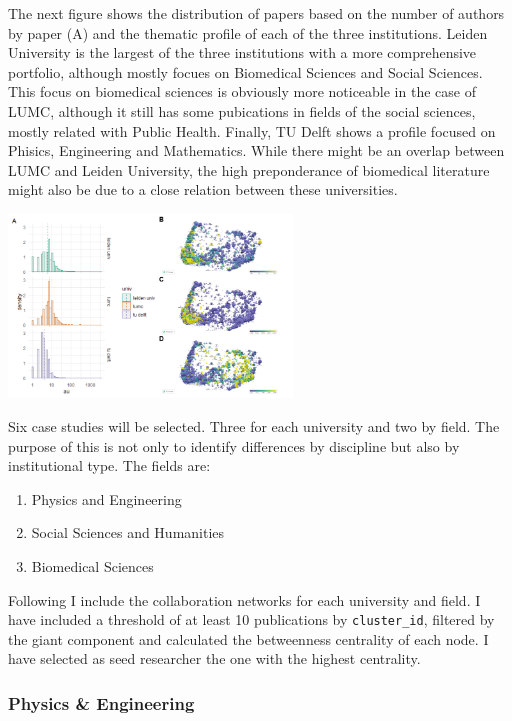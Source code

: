 \documentclass[]{elsarticle} %
\providecommand{\tightlist}{%
  \setlength{\itemsep}{0pt}\setlength{\parskip}{0pt}}
\begin{document}
The next figure shows the distribution of papers based on the number of
authors by paper (A) and the thematic profile of each of the three
institutions. Leiden University is the largest of the three institutions
with a more comprehensive portfolio, although mostly focues on
Biomedical Sciences and Social Sciences. This focus on biomedical
sciences is obviously more noticeable in the case of LUMC, although it
still has some pubications in fields of the social sciences, mostly
related with Public Health. Finally, TU Delft shows a profile focused on
Phisics, Engineering and Mathematics. While there might be an overlap
between LUMC and Leiden University, the high preponderance of biomedical
literature might also be due to a close relation between these
universities.

\includegraphics[width=2.97in]{figs/histogram-profiles}

Six case studies will be selected. Three for each university and two by
field. The purpose of this is not only to identify differences by
discipline but also by institutional type. The fields are:

\begin{enumerate}
\def\labelenumi{\arabic{enumi}.}
\tightlist
\item
  Physics and Engineering
\item
  Social Sciences and Humanities
\item
  Biomedical Sciences
\end{enumerate}

Following I include the collaboration networks for each university and
field. I have included a threshold of at least 10 publications by
\texttt{cluster\_id}, filtered by the giant component and calculated the
betweenness centrality of each node. I have selected as seed researcher
the one with the highest centrality.

\hypertarget{physics-engineering}{%
\subsubsection{Physics \& Engineering}\label{physics-engineering}}
\end{document}
